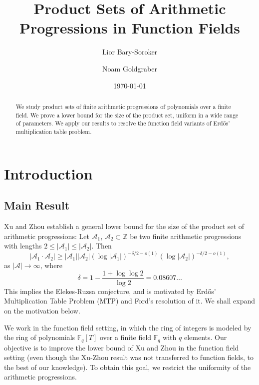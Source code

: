 \documentclass[12pt]{amsart}
\title%
{Product Sets of Arithmetic Progressions  in Function Fields}
\author{Lior Bary-Soroker}
\author{Noam Goldgraber}
\date{\today}
\numberwithin{equation}{section}
\theoremstyle{definition}
\theoremstyle{remark}
\newcommand{\FF}{\mathbb{F}}
\newcommand{\ZZ}{\mathbb{Z}}
\begin{document}
\begin{abstract}
    We study product sets of finite arithmetic progressions of polynomials over a finite field. We prove a lower bound for the size of the product set, uniform in a wide range of parameters. We apply our results to resolve the function field variants of Erd\H{o}s' multiplication table problem.
\end{abstract}




\maketitle

\section{Introduction}
    \subsection{Main Result}
    Xu and Zhou \cite{product_sets_of_APs} establish a general lower bound for the size of the product set of arithmetic progressions:   Let $\mathcal{A}_1$, $\mathcal{A}_2 \subset \ZZ$ be two finite arithmetic progressions with lengths $2 \leq |\mathcal{A}_1| \leq |\mathcal{A}_2|$. Then
    \begin{equation}\label{XuZhou}
               |\mathcal{A}_1 \cdot \mathcal{A}_2| \geq |\mathcal{A}_1||\mathcal{A}_2|(\log |\mathcal{A}_1|)^{-\delta/2 - o(1)}(\log |\mathcal{A}_2|)^{-\delta/2 - o(1)},
    \end{equation}
        as $ |\mathcal{A}| \to \infty$, where 
    \begin{equation}
        \delta = 1-\frac{1+\log \log 2}{\log 2} = 0.08607\ldots  
    \end{equation}
    This implies the Elekes-Ruzsa conjecture, and is
    motivated by Erd\H{o}s' Multiplication Table Problem (MTP) and Ford's \cite{Ford_MT} resolution of it. We shall expand on the motivation below.
    
    We work in the function field setting, in which the ring of integers is modeled by the ring of polynomials $\FF_q[T]$ over a finite field $\FF_q$ with $q$ elements. Our objective is to improve the lower bound of Xu and Zhou in the function field setting (even though the Xu-Zhou result was not transferred to function fields, to the best of our knowledge). To obtain this goal, we restrict the uniformity of the arithmetic progressions. 
    
\end{document}
